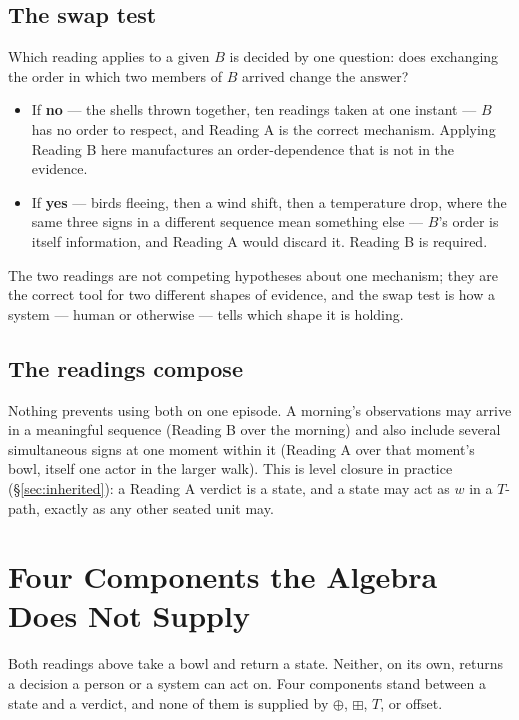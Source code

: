 \documentclass[12pt, a4paper]{article}
\begin{document}
\subsection{The swap test}
\label{subsec:swap_test}
Which reading applies to a given $B$ is decided by one question: does
exchanging the order in which two members of $B$ arrived change the
answer?
\begin{itemize}
\item If \textbf{no} --- the shells thrown together, ten readings
      taken at one instant --- $B$ has no order to respect, and
      Reading A is the correct mechanism. Applying Reading B here
      manufactures an order-dependence that is not in the evidence.
\item If \textbf{yes} --- birds fleeing, then a wind shift, then a
      temperature drop, where the same three signs in a different
      sequence mean something else --- $B$'s order is itself
      information, and Reading A would discard it. Reading B is
      required.
\end{itemize}
The two readings are not competing hypotheses about one mechanism;
they are the correct tool for two different shapes of evidence, and
the swap test is how a system --- human or otherwise --- tells which
shape it is holding.

\subsection{The readings compose}
\label{subsec:readings_compose}
Nothing prevents using both on one episode. A morning's observations
may arrive in a meaningful sequence (Reading B over the morning) and
also include several simultaneous signs at one moment within it
(Reading A over that moment's bowl, itself one actor in the larger
walk). This is level closure in practice (\S\ref{sec:inherited}): a
Reading A verdict is a state, and a state may act as $w$ in a $T$-path,
exactly as any other seated unit may.

\section{Four Components the Algebra Does Not Supply}
\label{sec:four_gaps}

Both readings above take a bowl and return a state. Neither, on its
own, returns a decision a person or a system can act on. Four
components stand between a state and a verdict, and none of them is
supplied by $\oplus$, $\boxplus$, $T$, or offset.
\end{document}
